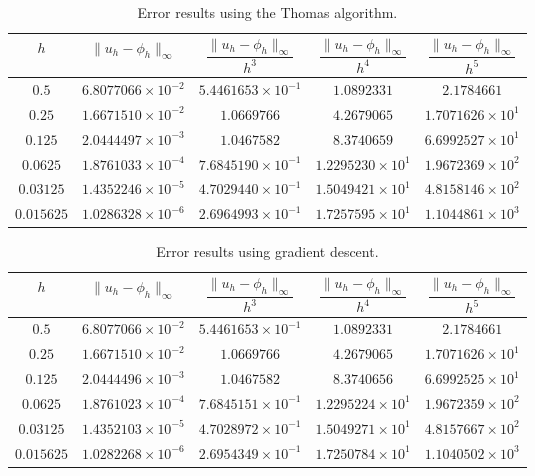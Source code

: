 \documentclass{article}
\begin{document}
\begin{table}[h!]
\centering
\caption{Error results using the Thomas algorithm.}
\begin{tabular}{|c c c c c|}
\hline
$h$ &
$\|u_h-\phi_h\|_\infty$ &
$\dfrac{\|u_h-\phi_h\|_\infty}{h^3}$ &
$\dfrac{\|u_h-\phi_h\|_\infty}{h^4}$ &
$\dfrac{\|u_h-\phi_h\|_\infty}{h^5}$ \\
\hline
$0.5$ &
$6.8077066\times10^{-2}$ &
$5.4461653\times10^{-1}$ &
$1.0892331$ &
$2.1784661$ \\

$0.25$ &
$1.6671510\times10^{-2}$ &
$1.0669766$ &
$4.2679065$ &
$1.7071626\times10^{1}$ \\

$0.125$ &
$2.0444497\times10^{-3}$ &
$1.0467582$ &
$8.3740659$ &
$6.6992527\times10^{1}$ \\

$0.0625$ &
$1.8761033\times10^{-4}$ &
$7.6845190\times10^{-1}$ &
$1.2295230\times10^{1}$ &
$1.9672369\times10^{2}$ \\

$0.03125$ &
$1.4352246\times10^{-5}$ &
$4.7029440\times10^{-1}$ &
$1.5049421\times10^{1}$ &
$4.8158146\times10^{2}$ \\

$0.015625$ &
$1.0286328\times10^{-6}$ &
$2.6964993\times10^{-1}$ &
$1.7257595\times10^{1}$ &
$1.1044861\times10^{3}$ \\
\hline
\end{tabular}
\end{table}

\begin{table}[h!]
\centering
\caption{Error results using gradient descent.}
\begin{tabular}{|c c c c c|}
\hline
$h$ &
$\|u_h-\phi_h\|_\infty$ &
$\dfrac{\|u_h-\phi_h\|_\infty}{h^3}$ &
$\dfrac{\|u_h-\phi_h\|_\infty}{h^4}$ &
$\dfrac{\|u_h-\phi_h\|_\infty}{h^5}$ \\
\hline
$0.5$ &
$6.8077066\times10^{-2}$ &
$5.4461653\times10^{-1}$ &
$1.0892331$ &
$2.1784661$ \\

$0.25$ &
$1.6671510\times10^{-2}$ &
$1.0669766$ &
$4.2679065$ &
$1.7071626\times10^{1}$ \\

$0.125$ &
$2.0444496\times10^{-3}$ &
$1.0467582$ &
$8.3740656$ &
$6.6992525\times10^{1}$ \\

$0.0625$ &
$1.8761023\times10^{-4}$ &
$7.6845151\times10^{-1}$ &
$1.2295224\times10^{1}$ &
$1.9672359\times10^{2}$ \\

$0.03125$ &
$1.4352103\times10^{-5}$ &
$4.7028972\times10^{-1}$ &
$1.5049271\times10^{1}$ &
$4.8157667\times10^{2}$ \\

$0.015625$ &
$1.0282268\times10^{-6}$ &
$2.6954349\times10^{-1}$ &
$1.7250784\times10^{1}$ &
$1.1040502\times10^{3}$ \\
\hline
\end{tabular}
\end{table}
\end{document}
